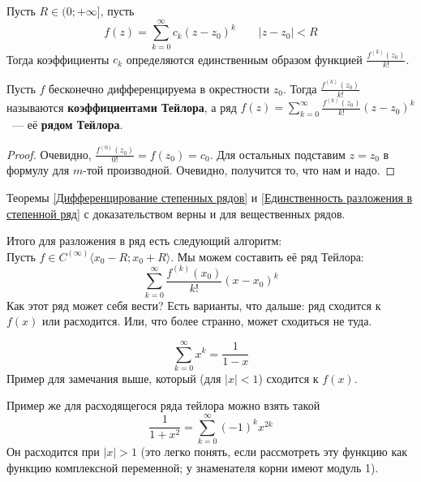\documentclass{article}
\begin{document}
    \begin{theorem}
        \label{Единственность разложения в степенной ряд}
        Пусть $R\in(0;+\infty]$, пусть
        $$
        f(z)=\sum\limits_{k=0}^\infty c_k(z-z_0)^k\qquad |z-z_0|<R
        $$
        Тогда коэффициенты $c_k$ определяются единственным образом функцией $\frac{f^{(k)}(z_0)}{k!}$.
    \end{theorem}
    \begin{definition}
        Пусть $f$ бесконечно дифференцируема в окрестности $z_0$. Тогда $\frac{f^{(k)}(z_0)}{k!}$ называются \textbf{коэффициентами Тейлора}, а ряд $f(z)=\sum\limits_{k=0}^\infty\frac{f^{(k)}(z_0)}{k!}(z-z_0)^k$~--- её \textbf{рядом Тейлора}.
    \end{definition}
    \begin{proof}
        Очевидно, $\frac{f^{(0)}(z_0)}{0!}=f(z_0)=c_0$. Для остальных подставим $z=z_0$ в формулу для $m$-той производной. Очевидно, получится то, что нам и надо.
    \end{proof}
    \begin{remark}
        Теоремы \ref{Дифференцирование степенных рядов} и \ref{Единственность разложения в степенной ряд} с доказательством верны и для вещественных рядов.
    \end{remark}
    \begin{remark}
        Итого для разложения в ряд есть следующий алгоритм:\\
        Пусть $f\in C^{(\infty)}\langle x_0-R;x_0+R\rangle$. Мы можем составить её ряд Тейлора:
        $$
        \sum\limits_{k=0}^\infty\frac{f^{(k)}(x_0)}{k!}(x-x_0)^k
        $$
        Как этот ряд может себя вести? Есть варианты, что дальше: ряд сходится к $f(x)$ или расходится. Или, что более странно, может сходиться не туда.
    \end{remark}
    \begin{example}
        $$
        \sum\limits_{k=0}^\infty x^k=\frac1{1-x}
        $$
        Пример для замечания выше, который (для $|x|<1$) сходится к $f(x)$.
    \end{example}
    \begin{example}
        Пример же для расходящегося ряда тейлора можно взять такой
        $$
        \frac1{1+x^2}=\sum\limits_{k=0}^\infty(-1)^kx^{2k}
        $$
        Он расходится при $|x|>1$ (это легко понять, если рассмотреть эту функцию как функцию комплексной переменной; у знаменателя корни имеют модуль 1). 
    \end{example}
\end{document}
